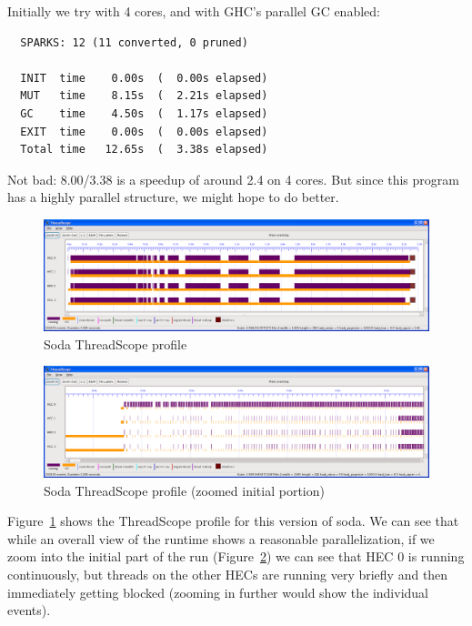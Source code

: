 \documentclass[twocolumn,9pt]{sigplanconf}
\begin{document}
Initially we try with 4 cores, and with GHC's parallel GC enabled:

\begin{verbatim}
  SPARKS: 12 (11 converted, 0 pruned)

  INIT  time    0.00s  (  0.00s elapsed)
  MUT   time    8.15s  (  2.21s elapsed)
  GC    time    4.50s  (  1.17s elapsed)
  EXIT  time    0.00s  (  0.00s elapsed)
  Total time   12.65s  (  3.38s elapsed)
\end{verbatim}

Not bad: 8.00/3.38 is a speedup of around 2.4 on 4 cores.  But since
this program has a highly parallel structure, we might hope to do
better.  

\begin{figure}
\begin{center}
\includegraphics[scale=0.3]{soda1.png}
\end{center}
\caption{Soda ThreadScope profile}
\label{f:soda-threadscope}
\end{figure}

\begin{figure}
\begin{center}
\includegraphics[scale=0.3]{soda2.png}
\end{center}
\caption{Soda ThreadScope profile (zoomed initial portion)}
\label{f:soda-threadscope2}
\end{figure}

Figure~\ref{f:soda-threadscope} shows the ThreadScope profile for this
version of soda.  We can see that while an overall view of the runtime
shows a reasonable parallelization, if we zoom into the initial part
of the run (Figure~\ref{f:soda-threadscope2}) we can see that HEC 0 is
running continuously, but threads on the other HECs are running very
briefly and then immediately getting blocked (zooming in further would
show the individual events).
\end{document}
